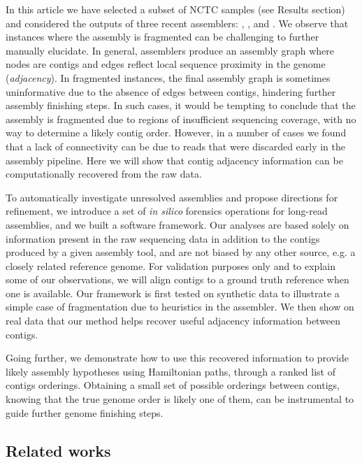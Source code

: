 \documentclass[./main.tex]{subfiles}
\newcommand{\modafterreview}[1]{#1}
\begin{document}
In this article we have selected a subset of NCTC samples (see Results section) and considered the outputs of three recent assemblers: \canu, \miniasm, and \hinge.
We observe that
instances where the assembly is fragmented can be challenging to further \modafterreview{manually} elucidate. 
In general, assemblers produce an assembly graph where nodes are contigs and edges reflect local sequence proximity in the genome (\emph{adjacency}). In fragmented instances, the final assembly graph is sometimes uninformative due to the absence of edges between contigs, hindering further assembly finishing steps. In such cases, it would be tempting to conclude that the assembly is fragmented due to regions of insufficient sequencing coverage, with no way to determine a likely contig order. However, in a number of cases we found that a lack of connectivity can be due to reads that were discarded early in the assembly pipeline. Here we will show that contig adjacency information can be computationally recovered from the raw data.
 
To automatically investigate unresolved assemblies and propose directions for refinement, we introduce a set of \modafterreview{\emph{in silico}} forensics operations for long-read assemblies, and we built a software framework. 
Our analyses are based solely on information present in the raw sequencing data \modafterreview{in addition to the contigs produced by a given assembly tool,} and are not biased by any other source, e.g. a closely related reference genome. For validation purposes \modafterreview{only} and to explain some of our observations, we will align contigs to a ground truth reference when one is available.
Our framework is first tested on synthetic data to illustrate a simple case of fragmentation due to heuristics in the \canu assembler.
We then show 
on real data
that our method helps recover useful adjacency information between contigs. 

Going further, we demonstrate how to use this recovered information to provide likely assembly hypotheses \modafterreview{using Hamiltonian paths}, through a ranked list of contigs orderings. Obtaining a small set of possible orderings between contigs, knowing that the true genome order is likely one of them, can be instrumental to guide further genome finishing steps.

\subsection{Related works}
\end{document}
